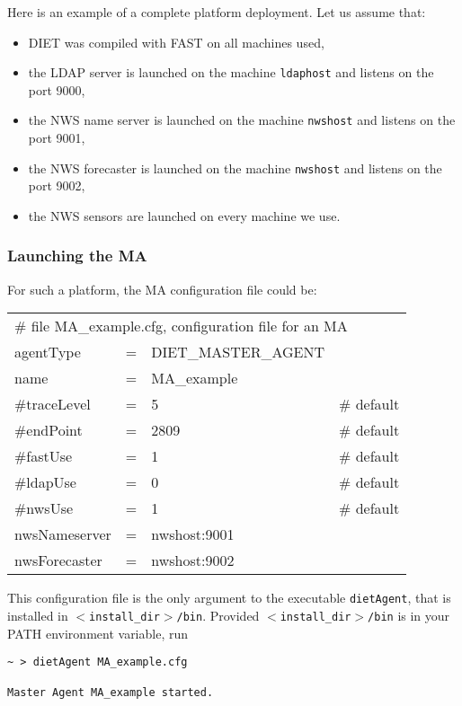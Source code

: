 Here is an example of a complete platform deployment. Let us assume that:

\begin{itemize}
\item DIET was compiled with FAST on all machines used,
\item the LDAP server is launched on the machine \texttt{ldaphost} and listens
  on the port 9000,
\item the NWS name server is launched on the machine \texttt{nwshost} and
  listens on the port 9001,
\item the NWS forecaster is launched on the machine \texttt{nwshost} and
  listens on the port 9002,
\item the NWS sensors are launched on every machine we use.
\end{itemize}


\subsubsection{Launching the MA}

For such a platform, the MA configuration file could be:
\tt
\begin{center}
 \footnotesize
 \begin{tabular}{lcll}
  \multicolumn{4}{l}{\# file MA\_example.cfg, configuration file for an MA}\\
  agentType    &=&DIET\_MASTER\_AGENT&\\
  name         &=&MA\_example        &\\
  \#traceLevel &=&5                  &\# default\\
  \#endPoint   &=&2809               &\# default\\
  \#fastUse    &=&1                  &\# default\\
  \#ldapUse    &=&0                  &\# default\\
  \#nwsUse     &=&1                  &\# default\\
  nwsNameserver&=&nwshost:9001       &\\
  nwsForecaster&=&nwshost:9002       &\\
 \end{tabular}
\end{center}
\rm

This configuration file is the only argument to the executable \texttt{dietAgent},
that is installed in \texttt{$<$install\_dir$>$/bin}. Provided
\texttt{$<$install\_dir$>$/bin} is in your PATH environment variable, run
{\footnotesize
\begin{verbatim}
~ > dietAgent MA_example.cfg

Master Agent MA_example started.
\end{verbatim}
}


